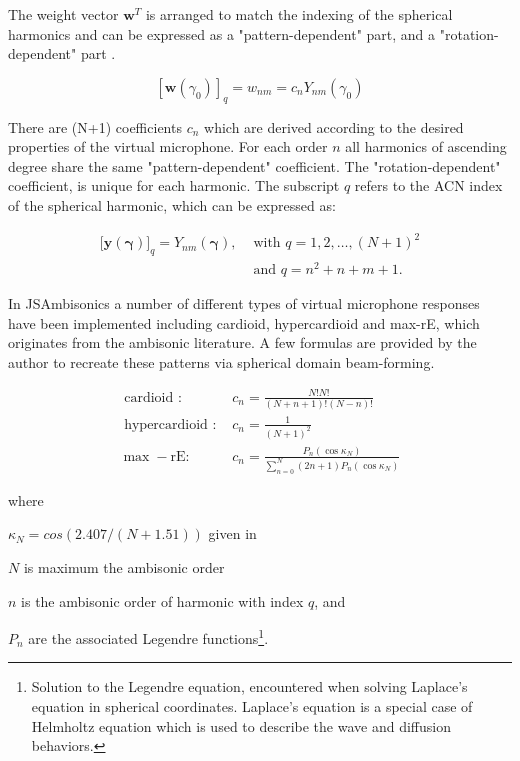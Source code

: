 
The weight vector $\mathbf{w}^{T}$ is arranged to match the indexing of the spherical harmonics and can be expressed as a "pattern-dependent" part, and a "rotation-dependent" part \cite{politis2016jsambisonics}. 

\begin{equation}
\left[\mathbf{w}\left(\gamma_{0}\right)\right]_{q}=w_{n m}=c_{n} Y_{n m}\left(\gamma_{0}\right)
\end{equation}

There are (N+1) coefficients $c_{n}$ which are derived according to the desired properties of the virtual microphone. For each order $n$ all harmonics of ascending degree share the same "pattern-dependent" coefficient. The "rotation-dependent" coefficient, is unique for each harmonic. The subscript $q$ refers to the ACN index of the spherical harmonic, which can be expressed as:

\begin{equation}
\begin{aligned}
\lbrack\mathbf{y}(\boldsymbol{\gamma})\rbrack_{q}=Y_{n m}(\boldsymbol{\gamma}), & \text { with } q=1,2, \ldots,(N+1)^{2} \\
& \text { and } q=n^{2}+n+m+1 .
\end{aligned}
\end{equation}

In JSAmbisonics a number of different types of virtual microphone responses have been implemented including cardioid, hypercardioid and max-rE, which originates from the ambisonic literature. A few formulas are provided by the author to recreate these patterns via spherical domain beam-forming. 

\begin{equation}
\begin{aligned}
\text { cardioid }: & c_{n}=\frac{N ! N !}{(N+n+1) !(N-n) !} \\
\text { hypercardioid : } & c_{n}=\frac{1}{(N+1)^{2}} \\
\max -\mathrm{rE}: & c_{n}=\frac{P_{n}\left(\cos \kappa_{N}\right)}{\sum_{n=0}^{N}(2 n+1) P_{n}\left(\cos \kappa_{N}\right)}
\end{aligned}
\label{vmic-responses}
\end{equation}

\noindent where
\begin{description}
\item  $\kappa_{N} = cos(2.407/(N + 1.51))$ given in \cite{zotter2012all} 
\item $N$ is maximum the ambisonic order
\item $n$ is the ambisonic order of harmonic with index $q$, and
\item $P_{n}$ are the associated Legendre functions\footnote{Solution to the Legendre equation, encountered when solving Laplace's equation in spherical coordinates. Laplace's equation is a special case of Helmholtz equation which is used to describe the wave and diffusion behaviors.}. 
\end{description}

